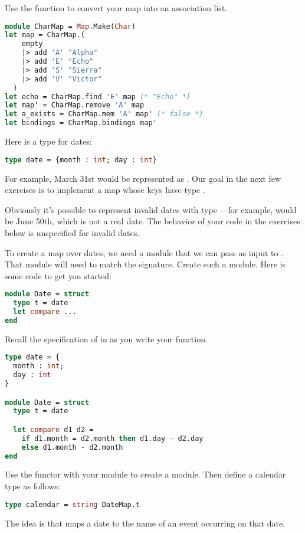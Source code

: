 Use the function  to convert your map into an association list.

\begin{lstlisting}[language=OCaml]
module CharMap = Map.Make(Char)
let map = CharMap.(
    empty
    |> add 'A' "Alpha"
    |> add 'E' "Echo"
    |> add 'S' "Sierra"
    |> add 'V' "Victor"
  )
let echo = CharMap.find 'E' map (* "Echo" *)
let map' = CharMap.remove 'A' map
let a_exists = CharMap.mem 'A' map' (* false *)
let bindings = CharMap.bindings map'
\end{lstlisting}

Here is a type for dates:
\begin{lstlisting}[language=OCaml]
type date = {month : int; day : int}
\end{lstlisting}
For example, March 31st would be represented as . Our goal in the next few exercises is to implement a map whose keys have type .

Obviously it's possible to represent invalid dates with type ---for example,  would be June 50th, which is not a real date. The behavior of your code in the exercises below is unspecified for invalid dates.

To create a map over dates, we need a module that we can pass as input to . That module will need to match the  signature. Create such a module. Here is some code to get you started:
\begin{lstlisting}[language=OCaml]
module Date = struct
  type t = date
  let compare ...
end
\end{lstlisting}
Recall the specification of  in  as you write your  function.

\begin{lstlisting}[language=OCaml]
type date = {
  month : int;
  day : int
}

module Date = struct
  type t = date

  let compare d1 d2 =
    if d1.month = d2.month then d1.day - d2.day
    else d1.month - d2.month
end
\end{lstlisting}

\problem[calendar]
Use the  functor with your  module to create a  module. Then define a calendar type as follows:
\begin{lstlisting}[language=OCaml]
type calendar = string DateMap.t
\end{lstlisting}
The idea is that  maps a date to the name of an event occurring on that date.

